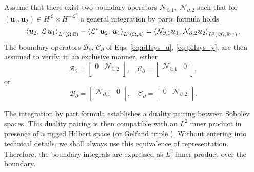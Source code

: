 \begin{assumption}
	\label{ass:operBC}
	Assume that there exist  two boundary operators $\mathcal{N}_{\partial, 1}, \; \mathcal{N}_{\partial, 2}$ such that for $(\bm{u}_1, \bm{u}_2) \in H^\mathcal{L} \times H^\mathcal{-L^*}$ a general integration by parts formula holds
	\begin{equation}\label{eq:intbypartsL} 
	\inner[L^2(\Omega, \mathbb{B})]{\bm{u}_2}{\mathcal{L}\,\bm{u}_1} - \inner[L^2(\Omega, \mathbb{A})]{\mathcal{L}^* \, \bm{u}_2}{\bm{u}_1} = \inner[L^2(\partial \Omega, \mathbb{R}^m)]{\mathcal{N}_{\partial, 1} \bm{u}_1}{\mathcal{N}_{\partial, 2} \bm{u}_2}. 
	\end{equation}
	The boundary operators $\mathcal{B}_\partial, \, \mathcal{C}_\partial$ of Eqs. \eqref{eq:pHsys_u}, \eqref{eq:pHsys_y}, are then assumed to verify, in an exclusive manner, either
	\begin{equation}\label{eq:assB2C1}
	\mathcal{B}_\partial = \begin{bmatrix}
	0 & \mathcal{N}_{\partial, 2} \\
	\end{bmatrix}, \quad 
	\mathcal{C}_\partial = \begin{bmatrix}
	\mathcal{N}_{\partial, 1} & 0 \\
	\end{bmatrix},
	\end{equation}
	or 
	\begin{equation}\label{eq:assB1C2}
	\mathcal{B}_\partial = \begin{bmatrix}
	\mathcal{N}_{\partial, 1} & 0 \\
	\end{bmatrix}, \quad \mathcal{C}_\partial = \begin{bmatrix}
	0 & \mathcal{N}_{\partial, 2} \\
	\end{bmatrix}.
	\end{equation}

\end{assumption}

\begin{remark}
	The integration by part formula establishes a duality pairing between Sobolev spaces. This duality pairing is then compatible with an $L^2$ inner product in presence of a rigged Hilbert space (or Gelfand triple \cite{gel1964generalized}). Without entering into technical details, we shall always use this equivalence of representation. Therefore, the boundary integrals are  expressed as $L^2$ inner product over the boundary. 
\end{remark}

